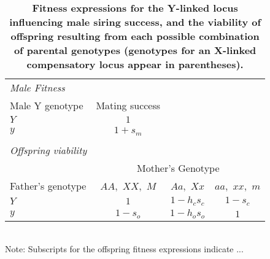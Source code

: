 \documentclass{article}
\begin{document}


\newpage



\begin{table}[htbp]
\centering
\caption{\bf Fitness expressions for the Y-linked locus influencing male siring success, and the viability of offspring resulting from each possible combination of parental genotypes (genotypes for an X-linked compensatory locus appear in parentheses).}
\begin{tabular}{l c c c} \\
\multicolumn{4}{l}{\textit{Male Fitness}} \\
 Male Y genotype & Mating success& & \\
 \hline
$Y$ & $1$       & & \\
$y$ & $1 + s_m$ & & \\
\hline
\\
\multicolumn{4}{l}{\textit{Offspring viability}} \\
 &  \multicolumn{3}{c}{Mother's Genotype} \\
 Father's genotype & $AA$,~$XX$,~$M$ & $Aa$,~$Xx$ & $aa$,~$xx$,~$m$ \\
\hline
 $Y$ & $1$       & $1 - h_c s_c$ & $1 - s_c$ \\
 $y$ & $1 - s_o$ & $1 - h_o s_o$ & $1$       \\
\hline
\end{tabular}
\label{tab:fitness}\\
{\footnotesize Note: Subscripts for the offspring fitness expressions indicate ... }
\end{table}
\newpage{}

\end{document}
